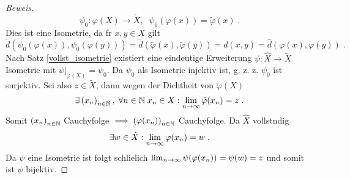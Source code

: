 \begin{proof}[Beweis]
	\[\psi_0: \varphi(X) \to \tilde X, \;\; \psi_0(\varphi(x)) = \tilde\varphi(x)\;.\]
	Dies ist eine Isometrie, da f\us r $x,y \in X$ gilt 
	\[\tilde d\left(\psi_0(\varphi(x)), \psi_0(\varphi(y))\right) = \tilde d(\tilde\varphi(x), \tilde\varphi(y)) = d(x,y) = \hat d(\varphi(x), \varphi(y))\;.\]
	Nach Satz \ref{vollst_isometrie} existiert eine eindeutige Erweiterung \(\psi: \hat X \to \tilde X\) Isometrie mit \(\psi\vert_{\varphi(X)} = \psi_0\). Da $\psi_0$ als Isometrie injektiv ist, g. z. z. $\psi_0$ ist surjektiv. Sei also \(z \in \tilde X\), dann wegen der Dichtheit von $\tilde\varphi(X)$
	\[\exists \left (x_n\right )_{n\in \mathbb{N}}, \; \forall n \in \mathbb{N}\; x_n \in X: \lim_{n \to\infty} \tilde\varphi(x_n) = z\;.\]
	Somit  \( \left (x_n\right )_{n\in \mathbb{N}}\) Cauchyfolge \( \implies \left (\varphi(x_n)\right )_{n\in \mathbb{N}} \) Cauchyfolge. Da $\hat X$ vollst\as ndig
	\[\exists w \in \hat X: \lim_{n \to\infty} \varphi(x_n) = w\;.\]
	Da $\psi$ eine Isometrie ist folgt schlie\s lich \(\lim_{n \to\infty} \psi(\varphi(x_n)) = \psi(w) = z\) und somit ist $\psi$ bijektiv.
\end{proof}

